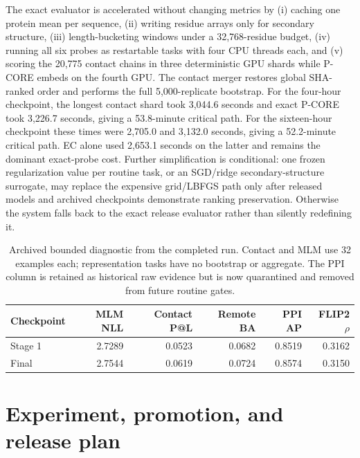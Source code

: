 \documentclass{article}
\begin{document}
The exact evaluator is accelerated without changing metrics by (i) caching one
protein mean per sequence, (ii) writing residue arrays only for secondary
structure, (iii) length-bucketing windows under a 32,768-residue budget,
(iv) running all six probes as restartable tasks with four CPU threads each,
and (v) scoring the 20,775 contact chains in three deterministic GPU shards
while P-CORE embeds on the fourth GPU. The contact merger restores global
SHA-ranked order and performs the full 5,000-replicate bootstrap. For the
four-hour checkpoint, the longest contact shard took 3,044.6 seconds and exact
P-CORE took 3,226.7 seconds, giving a 53.8-minute critical path. For the
sixteen-hour checkpoint these times were 2,705.0 and 3,132.0 seconds, giving a
52.2-minute critical path. EC alone used 2,653.1 seconds on the latter and
remains the dominant exact-probe cost. Further
simplification is conditional: one frozen regularization value
per routine task, or an SGD/ridge secondary-structure surrogate, may replace
the expensive grid/LBFGS path only after released models and archived
checkpoints demonstrate ranking preservation. Otherwise the system falls back
to the exact release evaluator rather than silently redefining it.

\begin{table}[H]
  \centering
  \small
  \begin{tabular}{@{}lrrrrr@{}}
    \toprule
    Checkpoint & MLM NLL & Contact P@L & Remote BA & PPI AP & FLIP2 $\rho$ \\
    \midrule
    Stage 1 & 2.7289 & 0.0523 & 0.0682 & 0.8519 & 0.3162 \\
    Final & 2.7544 & 0.0619 & 0.0724 & 0.8574 & 0.3150 \\
    \bottomrule
  \end{tabular}
  \caption{Archived bounded diagnostic from the completed run. Contact and MLM use 32 examples each; representation tasks have no bootstrap or aggregate. The PPI column is retained as historical raw evidence but is now quarantined and removed from future routine gates.}
\end{table}

\section{Experiment, promotion, and release plan}
\label{app:plan}
\end{document}

